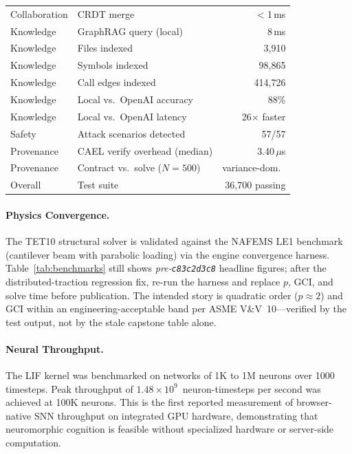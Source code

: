 \documentclass[sigchi-a]{acmart}
\begin{document}
\begin{table}[t]
\begin{tabular}{llr}
    Collaboration & CRDT merge                      & $<$1\,ms \\
    Knowledge   & GraphRAG query (local)            & 8\,ms \\
    Knowledge   & Files indexed                     & 3,910 \\
    Knowledge   & Symbols indexed                   & 98,865 \\
    Knowledge   & Call edges indexed                 & 414,726 \\
    Knowledge   & Local vs.\ OpenAI accuracy        & 88\% \\
    Knowledge   & Local vs.\ OpenAI latency         & 26$\times$ faster \\
    Safety      & Attack scenarios detected          & 57/57 \\
    Provenance  & CAEL verify overhead (median) & 3.40\,$\mu$s \\
    Provenance  & Contract vs.\ solve ($N{=}500$)      & variance-dom.~\cite{mcp-trust-paper} \\
    Overall     & Test suite                        & 36,700 passing \\
    \bottomrule
  \end{tabular}
\end{table}

\paragraph{Physics Convergence.}
The TET10 structural solver is validated against the NAFEMS LE1 benchmark
(cantilever beam with parabolic loading) via the engine convergence harness.
Table~\ref{tab:benchmarks} still shows \emph{pre-\texttt{c83c2d3c8}} headline figures;
after the distributed-traction regression fix, re-run the harness and replace
$p$, GCI, and solve time before publication.
The intended story is quadratic order ($p \approx 2$) and GCI within an
engineering-acceptable band per ASME V\&V~10---verified by the test output, not
by the stale capstone table alone.

\paragraph{Neural Throughput.}
The LIF kernel was benchmarked on networks of 1K to 1M neurons over 1000
timesteps. Peak throughput of $1.48 \times 10^9$~neuron-timesteps per second
was achieved at 100K neurons. This is the first reported measurement of
browser-native SNN throughput on integrated GPU hardware, demonstrating that
neuromorphic cognition is feasible without specialized hardware or server-side
computation.
\end{document}
